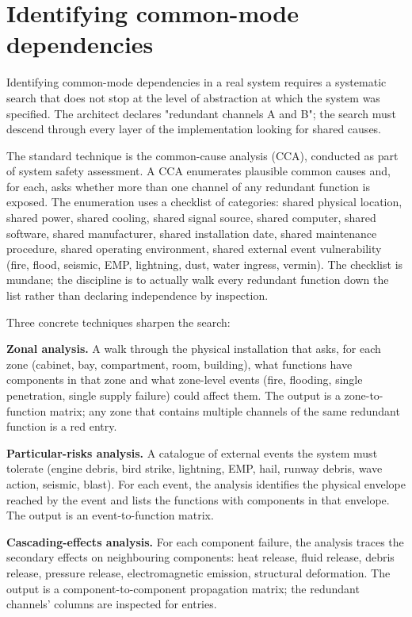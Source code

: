 \section{Identifying common-mode dependencies}

Identifying common-mode dependencies in a real system requires a systematic search that does not stop at the level of abstraction at which the system was specified. The architect declares "redundant channels A and B"; the search must descend through every layer of the implementation looking for shared causes.

The standard technique is the common-cause analysis (CCA), conducted as part of system safety assessment. A CCA enumerates plausible common causes and, for each, asks whether more than one channel of any redundant function is exposed. The enumeration uses a checklist of categories: shared physical location, shared power, shared cooling, shared signal source, shared computer, shared software, shared manufacturer, shared installation date, shared maintenance procedure, shared operating environment, shared external event vulnerability (fire, flood, seismic, EMP, lightning, dust, water ingress, vermin). The checklist is mundane; the discipline is to actually walk every redundant function down the list rather than declaring independence by inspection.

Three concrete techniques sharpen the search:

\textbf{Zonal analysis.} A walk through the physical installation that asks, for each zone (cabinet, bay, compartment, room, building), what functions have components in that zone and what zone-level events (fire, flooding, single penetration, single supply failure) could affect them. The output is a zone-to-function matrix; any zone that contains multiple channels of the same redundant function is a red entry.

\textbf{Particular-risks analysis.} A catalogue of external events the system must tolerate (engine debris, bird strike, lightning, EMP, hail, runway debris, wave action, seismic, blast). For each event, the analysis identifies the physical envelope reached by the event and lists the functions with components in that envelope. The output is an event-to-function matrix.

\textbf{Cascading-effects analysis.} For each component failure, the analysis traces the secondary effects on neighbouring components: heat release, fluid release, debris release, pressure release, electromagnetic emission, structural deformation. The output is a component-to-component propagation matrix; the redundant channels' columns are inspected for entries.

